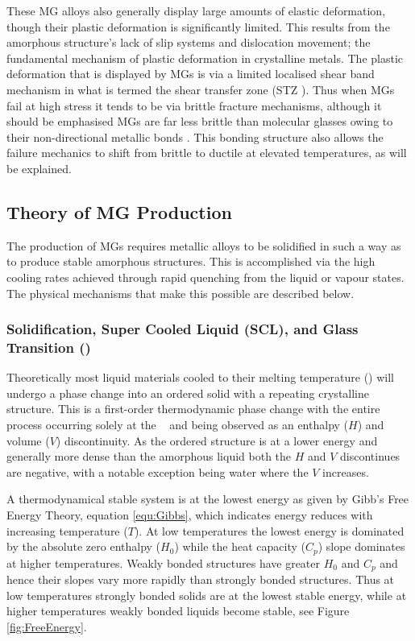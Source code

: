 \documentclass[a4paper,12pt,oneside]{report}%
\begin{document}
These MG alloys also generally display large amounts of elastic deformation, though their plastic deformation is significantly limited. This results from the amorphous structure's lack of slip systems and dislocation movement; the fundamental mechanism of plastic deformation in crystalline metals. The plastic deformation that is displayed by MGs is via a limited localised shear band mechanism in what is termed the shear transfer zone (STZ ). Thus when MGs fail at high stress it tends to be via brittle fracture mechanisms, although it should be emphasised MGs are far less brittle than molecular glasses owing to their non-directional metallic bonds \cite{Greer2013}. This bonding structure also allows the failure mechanics to shift from brittle to ductile at elevated temperatures, as will be explained.

\subsection{Theory of MG Production}
The production of MGs requires metallic alloys to be solidified in such a way as to produce stable amorphous structures. This is accomplished via the high cooling rates achieved through rapid quenching from the liquid or vapour states. The physical mechanisms that make this possible are described below.  


\subsubsection{Solidification, Super Cooled Liquid (SCL), and Glass Transition (\Tm)} \label{sec:Gibbs}
Theoretically most liquid materials cooled to their melting temperature (\Tm) will undergo a phase change into an ordered solid with a repeating crystalline structure. This is a first-order thermodynamic phase change with the entire process occurring solely at the \Tm~ and being observed as an enthalpy ($H$) and volume ($V$) discontinuity. As the ordered structure is at a lower energy and generally more dense than the amorphous liquid both the $H$ and $V$ discontinues are negative, with a notable exception being water where the $V$ increases.
 
A thermodynamical stable system is at the lowest energy as given by Gibb's Free Energy Theory, equation \ref{equ:Gibbs}, which indicates energy reduces with increasing temperature ($T$). At low temperatures the lowest energy is dominated by the absolute zero enthalpy ($H_{0}$) while the heat capacity ($C_{p}$) slope dominates at higher temperatures. Weakly bonded structures have greater $H_{0}$ and $C_{p}$ and hence their slopes vary more rapidly than strongly bonded structures. Thus at low temperatures strongly bonded solids are at the lowest stable energy, while at higher temperatures weakly bonded liquids become stable, see Figure \ref{fig:FreeEnergy}. 
\end{document}
